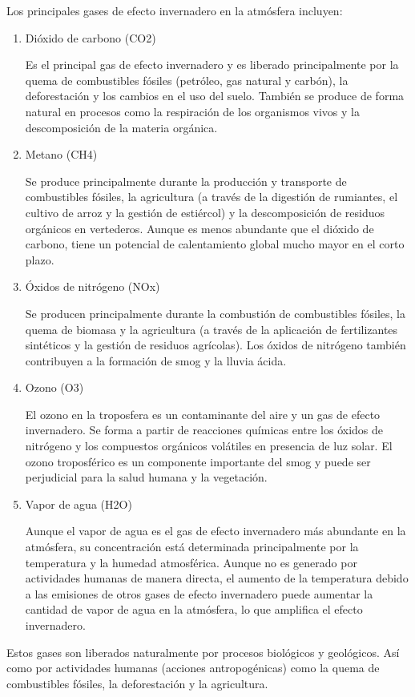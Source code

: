 \documentclass[12pt]{article}
\begin{document}
Los principales gases de efecto invernadero en la atmósfera incluyen:
\begin{enumerate}
\item Dióxido de carbono (CO2)

Es el principal gas de efecto invernadero y es liberado principalmente por la quema de combustibles fósiles (petróleo, gas natural y carbón), la deforestación y los cambios en el uso del suelo. También se produce de forma natural en procesos como la respiración de los organismos vivos y la descomposición de la materia orgánica.
\item Metano (CH4)

Se produce principalmente durante la producción y transporte de combustibles fósiles, la agricultura (a través de la digestión de rumiantes, el cultivo de arroz y la gestión de estiércol) y la descomposición de residuos orgánicos en vertederos. Aunque es menos abundante que el dióxido de carbono, tiene un potencial de calentamiento global mucho mayor en el corto plazo.
\item Óxidos de nitrógeno (NOx)

Se producen principalmente durante la combustión de combustibles fósiles, la quema de biomasa y la agricultura (a través de la aplicación de fertilizantes sintéticos y la gestión de residuos agrícolas). Los óxidos de nitrógeno también contribuyen a la formación de smog y la lluvia ácida.
\item Ozono (O3)

El ozono en la troposfera es un contaminante del aire y un gas de efecto invernadero. Se forma a partir de reacciones químicas entre los óxidos de nitrógeno y los compuestos orgánicos volátiles en presencia de luz solar. El ozono troposférico es un componente importante del smog y puede ser perjudicial para la salud humana y la vegetación.
\item Vapor de agua (H2O)

Aunque el vapor de agua es el gas de efecto invernadero más abundante en la atmósfera, su concentración está determinada principalmente por la temperatura y la humedad atmosférica. Aunque no es generado por actividades humanas de manera directa, el aumento de la temperatura debido a las emisiones de otros gases de efecto invernadero puede aumentar la cantidad de vapor de agua en la atmósfera, lo que amplifica el efecto invernadero.
\end{enumerate}
Estos gases son liberados naturalmente por procesos biológicos y geológicos. Así como por actividades humanas (acciones antropogénicas) como la quema de combustibles fósiles, la deforestación y la agricultura.
\end{document}
